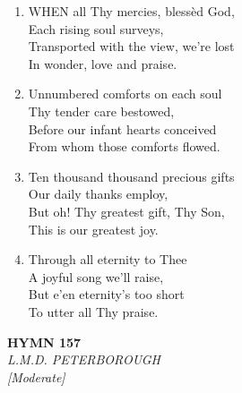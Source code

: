 \documentclass[11pt,a4paper]{article}
\begin{document}
\begin{enumerate}
    \item WHEN all Thy mercies, bless\`ed God, \\
        Each rising soul surveys, \\
        Transported with the view, we're lost \\
        In wonder, love and praise.

    \item Unnumbered comforts on each soul \\
        Thy tender care bestowed, \\
        Before our infant hearts conceived \\
        From whom those comforts flowed.

    \item Ten thousand thousand precious gifts \\
        Our daily thanks employ, \\
        But oh! Thy greatest gift, Thy Son, \\
        This is our greatest joy.

    \item Through all eternity to Thee \\
        A joyful song we'll raise, \\
        But e'en eternity's too short \\
        To utter all Thy praise.

\end{enumerate}

\newpage
\begin{center}
    {\Large \textbf{HYMN 157}}
    \\
    \textit{L.M.D. PETERBOROUGH}
    \\
    \textit{\small [Moderate]}
\end{center}
\vspace{1em}
\end{document}
